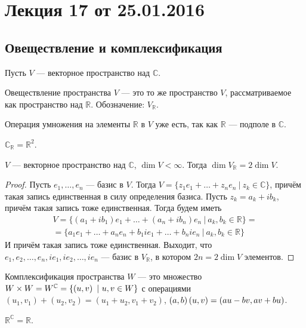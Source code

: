 \section{Лекция 17 от 25.01.2016}
\subsection{Овеществление и комплексификация}
Пусть $V$ --- векторное пространство над $\mathbb{C}$.
\begin{Def}
Овеществление пространства $V$ --- это то же пространство $V$, рассматриваемое как пространство над $\mathbb{R}$. Обозначение: $V_\mathbb{R}$.
\end{Def}
Операция умножения на элементы $\mathbb{R}$ в $V$ уже есть, так как $\mathbb{R}$ --- подполе в $\mathbb{C}$.

\begin{Examples}
$\mathbb{C}_\mathbb{R} = \mathbb{R}^2$.
\end{Examples}
\begin{Suggestion}
$V$ --- векторное пространство над $\mathbb{C}$, $\dim V < \infty$. Тогда $\dim V_\mathbb{R} = 2\dim V$.
\end{Suggestion}
\begin{proof}
Пусть $e_1, \ldots, e_n$ --- базис в $V$. Тогда $V = \{z_1e_1 + \ldots + z_ne_n\ |\ z_k \in \mathbb{C}\}$, причём такая запись единственная в силу определения базиса. Пусть $z_k = a_k+ib_k$, причём такая запись тоже единственная. Тогда будем иметь
\begin{gather*}
V = \{ \left(a_1+ib_1\right)e_1 + \ldots + \left(a_n+ib_n\right)e_n\ |\ a_k, b_k \in \mathbb{R}\} =\\
= \{a_1e_1 + \ldots + a_ne_n + b_1ie_1 + \ldots + b_nie_n\ |\ a_k, b_k \in \mathbb{R}\}
\end{gather*}
И причём такая запись тоже единственная. Выходит, что $e_1, e_2, \ldots, e_n, ie_1, ie_2, \ldots, ie_n$ --- базис в $V_\mathbb{R}$, в котором $2n = 2\dim V$ элементов.
\end{proof}
\begin{Def}
Комплексификация пространства $W$ --- это множество $W\times W = W^\mathbb{C} \hm{=} \{\left( u, v\right)\ |\ u,v \in W\}$ с операциями $\left(u_1, v_1\right) + \left(u_2, v_2\right) = \left(u_1+u_2, v_1+v_2\right)$, $\left(a, b\right)\left(u, v\right) \hm{=} \left(au-bv, av+bu\right)$.
\end{Def}
\begin{Examples}
$\mathbb{R}^\mathbb{C} = \mathbb{R}$.
\end{Examples}

